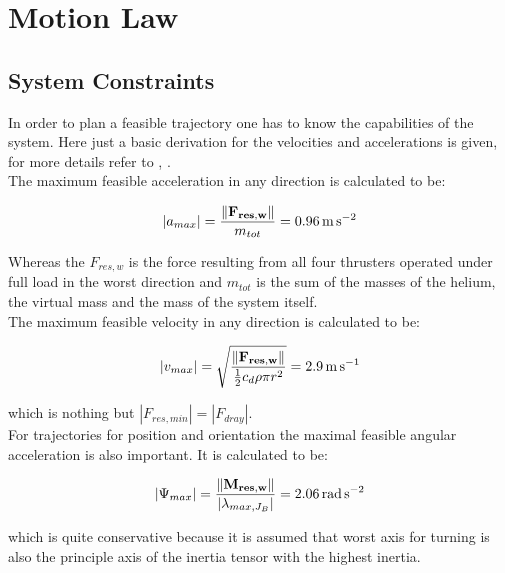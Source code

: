 \section{Motion Law}
\label{sec:motionLaw}
\subsection{System Constraints}
\label{subsec:systemConstraints}
In order to plan a feasible trajectory one has to know the capabilities of the system. Here just a basic derivation for the velocities and accelerations is given, for more details refer to \cite{weichart}, \cite{schaffnervu}. \\

The maximum feasible acceleration in any direction is calculated to be:

\begin{equation}
  \left|a_{max} \right| =  \frac{\| {\bf F_{res, w}}\|}{m_{tot}} = \SI{0.96}{\meter\per\square\second}
\end{equation}

Whereas the $F_{res,w}$ is the force resulting from all four thrusters operated under full load in the worst direction and $m_{tot}$ is the sum of the masses of the helium, the virtual mass and the mass of the system itself.\\


The maximum feasible velocity in any direction is calculated to be:

\begin{equation}
\left|v_{max} \right| = \sqrt{\frac{\|{\bf F_{res,w}} \|}{\frac{1}{2}c_d \rho \pi r^2}}=\SI{2.9}{\meter\per\second}
\end{equation}

which is nothing but $ \left|F_{res,min} \right| = \left|F_{dray} \right| $.\\

For trajectories for position and orientation the maximal feasible angular acceleration is also important. It is calculated to be:

\begin{equation}
\left|\Psi_{max} \right| =  \frac{\| {\bf M_{res,w}}\|}{\left| \lambda_{max, J_{B}} \right|} = \SI{2.06}{\radian\per\square\second}
\end{equation}

which is quite conservative because it is assumed that worst axis for turning is also the principle axis of the inertia tensor with the highest inertia.\\

